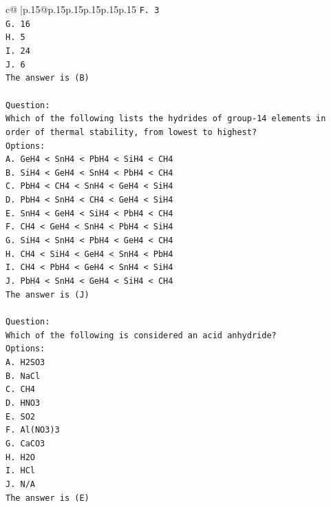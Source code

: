 \documentclass{article}
\begin{document}
{\begin{supertabular}{c@{$\;$}|p{.15\linewidth}@{}p{.15\linewidth}p{.15\linewidth}p{.15\linewidth}p{.15\linewidth}p{.15\linewidth}}
{{{\texttt{F. 3} \\
\texttt{G. 16} \\
\texttt{H. 5} \\
\texttt{I. 24} \\
\texttt{J. 6} \\
\texttt{The answer is (B)} \\
\\ 
\texttt{Question:} \\
\texttt{Which of the following lists the hydrides of group{-}14 elements in order of thermal stability, from lowest to highest?} \\
\texttt{Options:} \\
\texttt{A. GeH4 < SnH4 < PbH4 < SiH4 < CH4} \\
\texttt{B. SiH4 < GeH4 < SnH4 < PbH4 < CH4} \\
\texttt{C. PbH4 < CH4 < SnH4 < GeH4 < SiH4} \\
\texttt{D. PbH4 < SnH4 < CH4 < GeH4 < SiH4} \\
\texttt{E. SnH4 < GeH4 < SiH4 < PbH4 < CH4} \\
\texttt{F. CH4 < GeH4 < SnH4 < PbH4 < SiH4} \\
\texttt{G. SiH4 < SnH4 < PbH4 < GeH4 < CH4} \\
\texttt{H. CH4 < SiH4 < GeH4 < SnH4 < PbH4} \\
\texttt{I. CH4 < PbH4 < GeH4 < SnH4 < SiH4} \\
\texttt{J. PbH4 < SnH4 < GeH4 < SiH4 < CH4} \\
\texttt{The answer is (J)} \\
\\ 
\texttt{Question:} \\
\texttt{Which of the following is considered an acid anhydride?} \\
\texttt{Options:} \\
\texttt{A. H2SO3} \\
\texttt{B. NaCl} \\
\texttt{C. CH4} \\
\texttt{D. HNO3} \\
\texttt{E. SO2} \\
\texttt{F. Al(NO3)3} \\
\texttt{G. CaCO3} \\
\texttt{H. H2O} \\
\texttt{I. HCl} \\
\texttt{J. N/A} \\
\texttt{The answer is (E)} \\
\\ 
}}}
\end{supertabular}}
\end{document}
